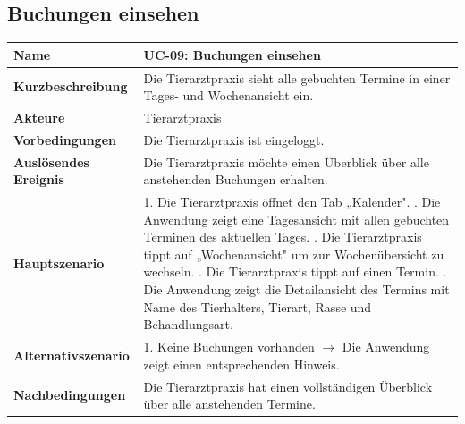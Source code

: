 \subsection{Buchungen einsehen}
\renewcommand{\arraystretch}{1.5}
\begin{tabular}{|p{5cm}|p{9.2cm}|}
\hline
\textbf{Name} & UC-09: Buchungen einsehen \\
\hline
\textbf{Kurzbeschreibung} & Die Tierarztpraxis sieht alle gebuchten 
Termine in einer Tages- und Wochenansicht ein. \\
\hline
\textbf{Akteure} & Tierarztpraxis \\
\hline
\textbf{Vorbedingungen} & 
Die Tierarztpraxis ist eingeloggt. \\
\hline
\textbf{Auslösendes Ereignis} & Die Tierarztpraxis möchte einen 
Überblick über alle anstehenden Buchungen erhalten. \\
\hline
\textbf{Hauptszenario} &
1. Die Tierarztpraxis öffnet den Tab „Kalender". \newline
2. Die Anwendung zeigt eine Tagesansicht mit allen gebuchten 
Terminen des aktuellen Tages. \newline
3. Die Tierarztpraxis tippt auf „Wochenansicht" um zur 
Wochenübersicht zu wechseln. \newline
4. Die Tierarztpraxis tippt auf einen Termin. \newline
5. Die Anwendung zeigt die Detailansicht des Termins mit 
Name des Tierhalters, Tierart, Rasse und Behandlungsart. \\
\hline
\textbf{Alternativszenario} &
1. Keine Buchungen vorhanden $\rightarrow$ Die Anwendung zeigt 
einen entsprechenden Hinweis. \\
\hline
\textbf{Nachbedingungen} &
Die Tierarztpraxis hat einen vollständigen Überblick über 
alle anstehenden Termine. \\
\hline
\end{tabular}

